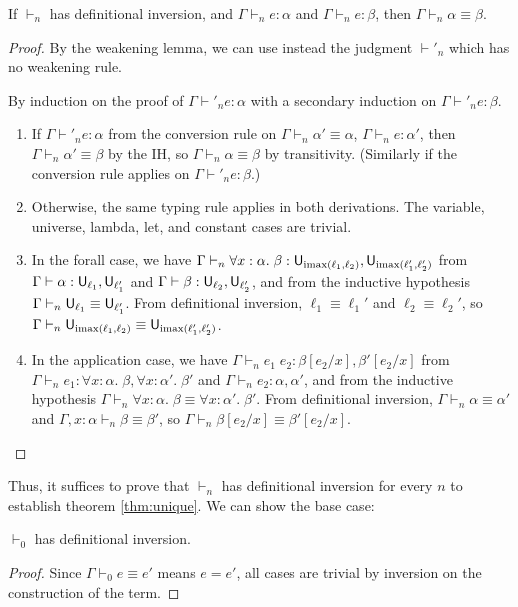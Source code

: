 \begin{theorem}\label{thm:utype}
If $\vdash_n$ has definitional inversion, and $\Gamma\vdash_n e:\alpha$ and $\Gamma\vdash_n e:\beta$, then $\Gamma\vdash_n\alpha\equiv\beta$.
\end{theorem}
\begin{proof}
By the weakening lemma, we can use instead the judgment $\vdash'_n$ which has no weakening rule.

By induction on the proof of $\Gamma\vdash'_n e:\alpha$ with a secondary induction on $\Gamma\vdash'_n e:\beta$.
\begin{enumerate}
\item If $\Gamma\vdash'_n e:\alpha$ from the conversion rule on $\Gamma\vdash_n\alpha'\equiv\alpha$, $\Gamma\vdash_n e:\alpha'$, then $\Gamma\vdash_n\alpha'\equiv\beta$ by the IH, so $\Gamma\vdash_n\alpha\equiv\beta$ by transitivity. (Similarly if the conversion rule applies on $\Gamma\vdash'_n e:\beta$.)
\item Otherwise, the same typing rule applies in both derivations. The variable, universe, lambda, let, and constant cases are trivial.
\item In the forall case, we have $\Gamma\vdash_n\forall x:\alpha.\;\beta:\U_{\imax(\ell_1,\ell_2)},\U_{\imax(\ell_1',\ell_2')}$ from $\Gamma\vdash\alpha:\U_{\ell_1},\U_{\ell_1'}$ and $\Gamma\vdash\beta:\U_{\ell_2},\U_{\ell_2'}$, and from the inductive hypothesis $\Gamma\vdash_n\U_{\ell_1}\equiv\U_{\ell_1'}$. From definitional inversion, $\ell_1\equiv \ell_1'$ and $\ell_2\equiv \ell_2'$, so $\Gamma\vdash_n\U_{\imax(\ell_1,\ell_2)}\equiv\U_{\imax(\ell_1',\ell_2')}$.
\item In the application case, we have $\Gamma\vdash_n e_1\;e_2:\beta[e_2/x],\beta'[e_2/x]$ from $\Gamma\vdash_n e_1:\forall x:\alpha.\;\beta,\forall x:\alpha'.\;\beta'$ and $\Gamma\vdash_n e_2:\alpha,\alpha'$, and from the inductive hypothesis $\Gamma\vdash_n\forall x:\alpha.\;\beta\equiv\forall x:\alpha'.\;\beta'$. From definitional inversion, $\Gamma\vdash_n\alpha\equiv\alpha'$ and $\Gamma,x:\alpha\vdash_n\beta\equiv\beta'$, so $\Gamma\vdash_n\beta[e_2/x]\equiv\beta'[e_2/x]$.
\end{enumerate}
\end{proof}

Thus, it suffices to prove that $\vdash_n$ has definitional inversion for every $n$ to establish theorem \ref{thm:unique}. We can show the base case:
\begin{lemma}\label{thm:0dinv}
$\vdash_0$ has definitional inversion.
\end{lemma}
\begin{proof}
Since $\Gamma\vdash_0 e\equiv e'$ means $e=e'$, all cases are trivial by inversion on the construction of the term.
\end{proof}

